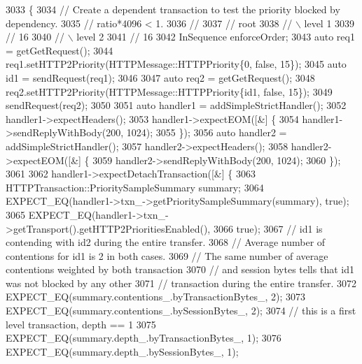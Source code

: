 \begin{DoxyCode}
3033                                                                       \{
3034   \textcolor{comment}{// Create a dependent transaction to test the priority blocked by dependency.}
3035   \textcolor{comment}{// ratio*4096 < 1.}
3036   \textcolor{comment}{//}
3037   \textcolor{comment}{//     root}
3038   \textcolor{comment}{//      \(\backslash\)                                                 level 1}
3039   \textcolor{comment}{//      16}
3040   \textcolor{comment}{//       \(\backslash\)                                                level 2}
3041   \textcolor{comment}{//       16}
3042   InSequence enforceOrder;
3043   \textcolor{keyword}{auto} req1 = getGetRequest();
3044   req1.setHTTP2Priority(HTTPMessage::HTTPPriority\{0, \textcolor{keyword}{false}, 15\});
3045   \textcolor{keyword}{auto} id1 = sendRequest(req1);
3046 
3047   \textcolor{keyword}{auto} req2 = getGetRequest();
3048   req2.setHTTP2Priority(HTTPMessage::HTTPPriority\{id1, \textcolor{keyword}{false}, 15\});
3049   sendRequest(req2);
3050 
3051   \textcolor{keyword}{auto} handler1 = addSimpleStrictHandler();
3052   handler1->expectHeaders();
3053   handler1->expectEOM([&] \{
3054       handler1->sendReplyWithBody(200, 1024);
3055     \});
3056   \textcolor{keyword}{auto} handler2 = addSimpleStrictHandler();
3057   handler2->expectHeaders();
3058   handler2->expectEOM([&] \{
3059       handler2->sendReplyWithBody(200, 1024);
3060     \});
3061 
3062   handler1->expectDetachTransaction([&] \{
3063       HTTPTransaction::PrioritySampleSummary summary;
3064       EXPECT\_EQ(handler1->txn\_->getPrioritySampleSummary(summary), \textcolor{keyword}{true});
3065       EXPECT\_EQ(handler1->txn\_->getTransport().getHTTP2PrioritiesEnabled(),
3066                 \textcolor{keyword}{true});
3067       \textcolor{comment}{// id1 is contending with id2 during the entire transfer.}
3068       \textcolor{comment}{// Average number of contentions for id1 is 2 in both cases.}
3069       \textcolor{comment}{// The same number of average contentions weighted by both transaction}
3070       \textcolor{comment}{// and session bytes tells that id1 was not blocked by any other}
3071       \textcolor{comment}{// transaction during the entire transfer.}
3072       EXPECT\_EQ(summary.contentions_.byTransactionBytes_, 2);
3073       EXPECT\_EQ(summary.contentions_.bySessionBytes_, 2);
3074       \textcolor{comment}{// this is a first level transaction, depth == 1}
3075       EXPECT\_EQ(summary.depth_.byTransactionBytes_, 1);
3076       EXPECT\_EQ(summary.depth_.bySessionBytes_, 1);

\end{DoxyCode}
